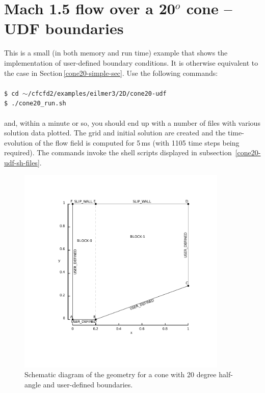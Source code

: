 
\section{Mach 1.5 flow over a 20$^o$ cone -- UDF boundaries}
\label{sec:cone20-udf}
%
This is a small (in both memory and run time) example 
that shows the implementation of user-defined boundary conditions.
It is otherwise equivalent to the case in Section\,\ref{cone20-simple-sec}.
Use the following commands:\\
%
\topbar\\
\texttt{\$ cd $\sim$/cfcfd2/examples/eilmer3/2D/cone20-udf}\\
\texttt{\$ ./cone20\_run.sh}\\
\bottombar\\
%
and, within a minute or so, you should end up with a number of files
with various solution data plotted.
The grid and initial solution are created and the time-evolution of the
flow field is computed for 5\,ms (with 1105 time steps being required).
The commands invoke the shell scripts displayed in 
subsection~\ref{cone20-udf-sh-files}.
%

\begin{figure}[htbp]
\begin{center}
\includegraphics[width=10cm, viewport=76 78 389 398]{../2D/cone20-udf/cone20_svg.pdf}
\end{center}
\caption{Schematic diagram of the geometry for a cone 
         with 20 degree half-angle and user-defined boundaries.}
\label{cone20-udf-geometry-fig}
\end{figure}

